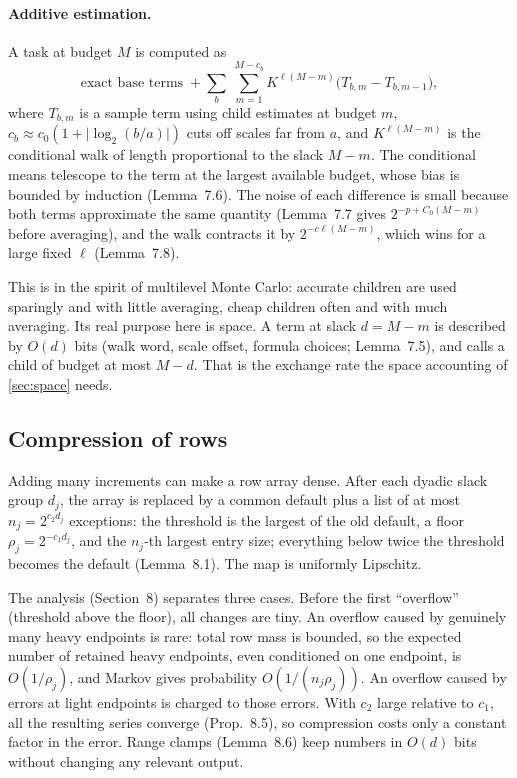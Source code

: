 \documentclass[11pt]{article}
\theoremstyle{definition}
\theoremstyle{remark}
\newcommand{\abs}[1]{\lvert #1\rvert}
\begin{document}
\paragraph{Additive estimation.} A task at budget $M$ is computed as
\[
\text{exact base terms}\;+\sum_{b}\ \sum_{m=1}^{M-c_b}K^{\ell(M-m)}\bigl(T_{b,m}-T_{b,m-1}\bigr),
\]
where $T_{b,m}$ is a sample term using child estimates at budget $m$, $c_b\approx
c_0(1+\abs{\log_2(b/a)})$ cuts off scales far from $a$, and $K^{\ell(M-m)}$ is the
conditional walk of length proportional to the slack $M-m$. The conditional means
telescope to the term at the largest available budget, whose bias is bounded by
induction (Lemma~7.6). The noise of each difference is small because both terms
approximate the same quantity (Lemma~7.7 gives $2^{-p+C_0(M-m)}$ before
averaging), and the walk contracts it by $2^{-c\ell(M-m)}$, which wins for a
large fixed $\ell$ (Lemma~7.8).

\begin{idea}
This is in the spirit of multilevel Monte Carlo: accurate children are used
sparingly and with little averaging, cheap children often and with much
averaging. Its real purpose here is space. A term at slack $d=M-m$ is described
by $O(d)$ bits (walk word, scale offset, formula choices; Lemma~7.5), and calls a
child of budget at most $M-d$. That is the exchange rate the space accounting
of \cref{sec:space} needs.
\end{idea}

\subsection{Compression of rows}\label{sec:compression}

Adding many increments can make a row array dense. After each dyadic slack group
$d_j$, the array is replaced by a common default plus a list of at most
$n_j=2^{c_2d_j}$ exceptions: the threshold is the largest of the old default, a
floor $\rho_j=2^{-c_1d_j}$, and the $n_j$-th largest entry size; everything below
twice the threshold becomes the default (Lemma~8.1). The map is uniformly Lipschitz.

The analysis (Section~8) separates three cases. Before the first ``overflow''
(threshold above the floor), all changes are tiny. An overflow caused by genuinely
many heavy endpoints is rare: total row mass is bounded, so the expected number of
retained heavy endpoints, even conditioned on one endpoint, is $O(1/\rho_j)$, and
Markov gives probability $O(1/(n_j\rho_j))$. An overflow caused by errors at light
endpoints is charged to those errors. With $c_2$ large relative to $c_1$, all the
resulting series converge (Prop.~8.5), so compression costs only a constant
factor in the error. Range clamps (Lemma~8.6) keep numbers in $O(d)$ bits without
changing any relevant output.
\end{document}
